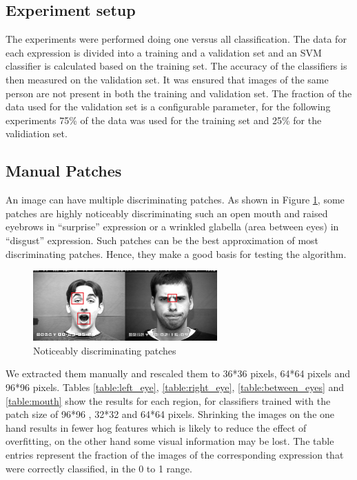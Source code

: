 \subsection{Experiment setup}
The experiments were performed doing one versus all classification. The data for each expression is divided into a training and a validation set and an SVM
classifier is calculated based on the training set. The accuracy of the classifiers is then measured on the validation set. It was ensured that images of the same
person are not present in both the training and validation set. The fraction of the data used for the validation set is a configurable parameter, for the
following experiments 75\% of the data was used for the training set and 25\% for the validiation set.

\subsection{Manual Patches}\label{sec:experiments:manual}

An image can have multiple discriminating patches. As shown in Figure \ref{fig:manual_patch}, some patches are highly noticeably discriminating such an open mouth and raised eyebrows in "`surprise"' expression or a wrinkled glabella (area between eyes) in "`disgust"' expression. Such patches can be the best approximation of most discriminating patches. Hence, they make a good basis for testing the algorithm.

\begin{figure}
\centering
\includegraphics[width=200pt]{img/manual_patch.png}
  \caption{Noticeably discriminating patches}
  \label{fig:manual_patch}
\end{figure}


We extracted them manually and rescaled them to 36*36 pixels, 64*64 pixels and 96*96 pixels. Tables \ref{table:left_eye}, \ref{table:right_eye}, \ref{table:between_eyes} and \ref{table:mouth} show the results for each region, for classifiers trained  with the  patch size of 96*96 , 32*32 and 64*64 pixels. Shrinking the images on the one hand results in fewer hog features which is likely to reduce the effect of overfitting, on the other hand some visual information may be lost. The table entries represent the fraction of the images of the corresponding expression that were correctly classified, in the 0 to 1 range.

